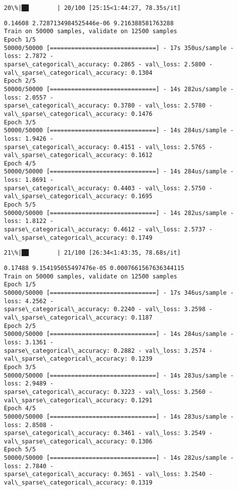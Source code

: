 \documentclass[11pt]{article}
\begin{document}
    \begin{Verbatim}[commandchars=\\\{\}]
 20\%|██        | 20/100 [25:15<1:44:27, 78.35s/it]
    \end{Verbatim}

    \begin{Verbatim}[commandchars=\\\{\}]
0.14608 2.7287134984525446e-06 9.216388581763288
Train on 50000 samples, validate on 12500 samples
Epoch 1/5
50000/50000 [==============================] - 17s 350us/sample - loss: 2.7872 -
sparse\_categorical\_accuracy: 0.2865 - val\_loss: 2.5800 -
val\_sparse\_categorical\_accuracy: 0.1304
Epoch 2/5
50000/50000 [==============================] - 14s 282us/sample - loss: 2.0557 -
sparse\_categorical\_accuracy: 0.3780 - val\_loss: 2.5780 -
val\_sparse\_categorical\_accuracy: 0.1476
Epoch 3/5
50000/50000 [==============================] - 14s 284us/sample - loss: 1.9426 -
sparse\_categorical\_accuracy: 0.4151 - val\_loss: 2.5765 -
val\_sparse\_categorical\_accuracy: 0.1612
Epoch 4/5
50000/50000 [==============================] - 14s 284us/sample - loss: 1.8691 -
sparse\_categorical\_accuracy: 0.4403 - val\_loss: 2.5750 -
val\_sparse\_categorical\_accuracy: 0.1695
Epoch 5/5
50000/50000 [==============================] - 14s 282us/sample - loss: 1.8122 -
sparse\_categorical\_accuracy: 0.4612 - val\_loss: 2.5737 -
val\_sparse\_categorical\_accuracy: 0.1749
    \end{Verbatim}

    \begin{Verbatim}[commandchars=\\\{\}]
 21\%|██        | 21/100 [26:34<1:43:35, 78.68s/it]
    \end{Verbatim}

    \begin{Verbatim}[commandchars=\\\{\}]
0.17488 9.154195055497476e-05 0.0007661567636344115
Train on 50000 samples, validate on 12500 samples
Epoch 1/5
50000/50000 [==============================] - 17s 346us/sample - loss: 4.2562 -
sparse\_categorical\_accuracy: 0.2240 - val\_loss: 3.2598 -
val\_sparse\_categorical\_accuracy: 0.1187
Epoch 2/5
50000/50000 [==============================] - 14s 284us/sample - loss: 3.1361 -
sparse\_categorical\_accuracy: 0.2882 - val\_loss: 3.2574 -
val\_sparse\_categorical\_accuracy: 0.1239
Epoch 3/5
50000/50000 [==============================] - 14s 283us/sample - loss: 2.9489 -
sparse\_categorical\_accuracy: 0.3223 - val\_loss: 3.2560 -
val\_sparse\_categorical\_accuracy: 0.1291
Epoch 4/5
50000/50000 [==============================] - 14s 283us/sample - loss: 2.8508 -
sparse\_categorical\_accuracy: 0.3461 - val\_loss: 3.2549 -
val\_sparse\_categorical\_accuracy: 0.1306
Epoch 5/5
50000/50000 [==============================] - 14s 282us/sample - loss: 2.7840 -
sparse\_categorical\_accuracy: 0.3651 - val\_loss: 3.2540 -
val\_sparse\_categorical\_accuracy: 0.1319
    \end{Verbatim}
\end{document}
